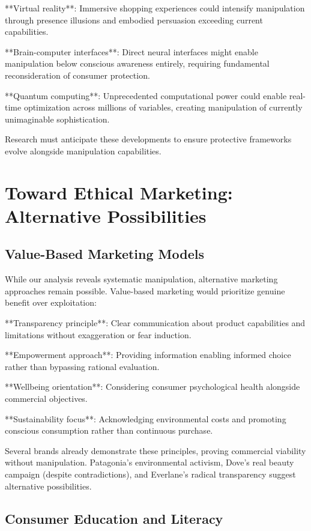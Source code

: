 **Virtual reality**: Immersive shopping experiences could intensify manipulation through presence illusions and embodied persuasion exceeding current capabilities.

**Brain-computer interfaces**: Direct neural interfaces might enable manipulation below conscious awareness entirely, requiring fundamental reconsideration of consumer protection.

**Quantum computing**: Unprecedented computational power could enable real-time optimization across millions of variables, creating manipulation of currently unimaginable sophistication.

Research must anticipate these developments to ensure protective frameworks evolve alongside manipulation capabilities.

\section{Toward Ethical Marketing: Alternative Possibilities}
\label{sec:alternatives}

\subsection{Value-Based Marketing Models}

While our analysis reveals systematic manipulation, alternative marketing approaches remain possible. Value-based marketing would prioritize genuine benefit over exploitation:

**Transparency principle**: Clear communication about product capabilities and limitations without exaggeration or fear induction.

**Empowerment approach**: Providing information enabling informed choice rather than bypassing rational evaluation.

**Wellbeing orientation**: Considering consumer psychological health alongside commercial objectives.

**Sustainability focus**: Acknowledging environmental costs and promoting conscious consumption rather than continuous purchase.

Several brands already demonstrate these principles, proving commercial viability without manipulation. Patagonia's environmental activism, Dove's real beauty campaign (despite contradictions), and Everlane's radical transparency suggest alternative possibilities.

\subsection{Consumer Education and Literacy}

